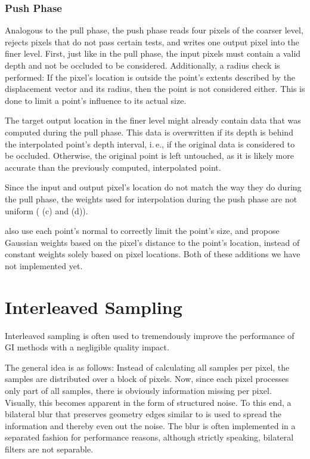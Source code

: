 \subsubsection{Push Phase}

Analogous to the pull phase, the push phase reads four pixels of the coarser level, rejects pixels that do not pass certain tests, and writes one output pixel into the finer level. First, just like in the pull phase, the input pixels must contain a valid depth and not be occluded to be considered. Additionally, a radius check is performed: If the pixel's location is outside the point's extents described by the displacement vector and its radius, then the point is not considered either. This is done to limit a point's influence to its actual size.

The target output location in the finer level might already contain data that was computed during the pull phase. This data is overwritten if its depth is behind the interpolated point's depth interval, i.\,e., if the original data is considered to be occluded. Otherwise, the original point is left untouched, as it is likely more accurate than the previously computed, interpolated point.

Since the input and output pixel's location do not match the way they do during the pull phase, the weights used for interpolation during the push phase are not uniform ( (c) and (d)).

 \citet{Marroquim:2007:reconstruction} also use each point's normal to correctly limit the point's size, and \citet{Marroquim:2008:reconstruction2} propose Gaussian weights based on the pixel's distance to the point's location, instead of constant weights solely based on pixel locations. Both of these additions we have not implemented yet.



 \section{Interleaved Sampling}
 \label{sec:concept:interleavedSampling}
 Interleaved sampling \citep{Keller:2001:InterleavedSampling} is often used to tremendously improve the performance of GI methods with a negligible quality impact.

 The general idea is as follows: Instead of calculating all samples per pixel, the samples are distributed over a block of pixels. Now, since each pixel processes only part of all samples, there is obviously information missing per pixel. Visually, this becomes apparent in the form of structured noise. To this end, a bilateral blur that preserves geometry edges similar to \citet{laine2007incremental} is used to spread the information and thereby even out the noise. The blur is often implemented in a separated fashion for performance reasons, although strictly speaking, bilateral filters are not separable.

